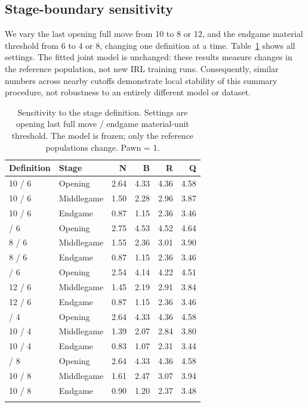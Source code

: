 \documentclass{jcst}
\begin{document}
\subsection{Stage-boundary sensitivity}
We vary the last opening full move from 10 to 8 or 12, and the endgame material threshold from 6 to 4 or 8, changing one definition at a time. Table~\ref{tab:boundary} shows all settings. The fitted joint model is unchanged: these results measure changes in the reference population, not new IRL training runs. Consequently, similar numbers across nearby cutoffs demonstrate local stability of this summary procedure, not robustness to an entirely different model or dataset.
\begin{table}[tbp]\centering
\small
\caption{Sensitivity to the stage definition. Settings are opening last full move / endgame material-unit threshold. The model is frozen; only the reference populations change. Pawn = 1.}\label{tab:boundary}
\begin{tabular}{llrrrr}
\toprule
Definition & Stage & N & B & R & Q\\\midrule
10 / 6 & Opening & 2.64 & 4.33 & 4.36 & 4.58\\
10 / 6 & Middlegame & 1.50 & 2.28 & 2.96 & 3.87\\
10 / 6 & Endgame & 0.87 & 1.15 & 2.36 & 3.46\\
\addlinespace
8 / 6 & Opening & 2.75 & 4.53 & 4.52 & 4.64\\
8 / 6 & Middlegame & 1.55 & 2.36 & 3.01 & 3.90\\
8 / 6 & Endgame & 0.87 & 1.15 & 2.36 & 3.46\\
\addlinespace
12 / 6 & Opening & 2.54 & 4.14 & 4.22 & 4.51\\
12 / 6 & Middlegame & 1.45 & 2.19 & 2.91 & 3.84\\
12 / 6 & Endgame & 0.87 & 1.15 & 2.36 & 3.46\\
\addlinespace
10 / 4 & Opening & 2.64 & 4.33 & 4.36 & 4.58\\
10 / 4 & Middlegame & 1.39 & 2.07 & 2.84 & 3.80\\
10 / 4 & Endgame & 0.83 & 1.07 & 2.31 & 3.44\\
\addlinespace
10 / 8 & Opening & 2.64 & 4.33 & 4.36 & 4.58\\
10 / 8 & Middlegame & 1.61 & 2.47 & 3.07 & 3.94\\
10 / 8 & Endgame & 0.90 & 1.20 & 2.37 & 3.48\\
\addlinespace
\bottomrule\end{tabular}\end{table}
\end{document}
